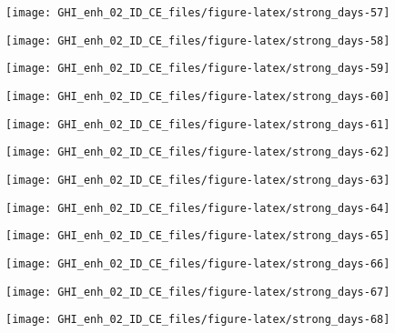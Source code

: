 \documentclass[
  10pt,
  a4paper,oneside]{article}
\begin{document}
\begin{center}\texttt{[image: GHI\_enh\_02\_ID\_CE\_files/figure-latex/strong\_days-57]} \end{center}

\begin{center}\texttt{[image: GHI\_enh\_02\_ID\_CE\_files/figure-latex/strong\_days-58]} \end{center}

\begin{center}\texttt{[image: GHI\_enh\_02\_ID\_CE\_files/figure-latex/strong\_days-59]} \end{center}

\begin{center}\texttt{[image: GHI\_enh\_02\_ID\_CE\_files/figure-latex/strong\_days-60]} \end{center}

\begin{center}\texttt{[image: GHI\_enh\_02\_ID\_CE\_files/figure-latex/strong\_days-61]} \end{center}

\begin{center}\texttt{[image: GHI\_enh\_02\_ID\_CE\_files/figure-latex/strong\_days-62]} \end{center}

\begin{center}\texttt{[image: GHI\_enh\_02\_ID\_CE\_files/figure-latex/strong\_days-63]} \end{center}

\begin{center}\texttt{[image: GHI\_enh\_02\_ID\_CE\_files/figure-latex/strong\_days-64]} \end{center}

\begin{center}\texttt{[image: GHI\_enh\_02\_ID\_CE\_files/figure-latex/strong\_days-65]} \end{center}

\begin{center}\texttt{[image: GHI\_enh\_02\_ID\_CE\_files/figure-latex/strong\_days-66]} \end{center}

\begin{center}\texttt{[image: GHI\_enh\_02\_ID\_CE\_files/figure-latex/strong\_days-67]} \end{center}

\begin{center}\texttt{[image: GHI\_enh\_02\_ID\_CE\_files/figure-latex/strong\_days-68]} \end{center}
\end{document}
